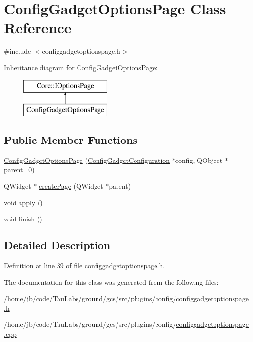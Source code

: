 \hypertarget{class_config_gadget_options_page}{\section{\-Config\-Gadget\-Options\-Page \-Class \-Reference}
\label{class_config_gadget_options_page}
}


{\ttfamily \#include $<$configgadgetoptionspage.\-h$>$}

\-Inheritance diagram for \-Config\-Gadget\-Options\-Page\-:\begin{figure}[H]
\begin{center}
\leavevmode
\includegraphics[height=2.000000cm]{class_config_gadget_options_page}
\end{center}
\end{figure}
\subsection*{\-Public \-Member \-Functions}
\begin{DoxyCompactItemize}
\item 
\hyperlink{group___config_plugin_ga2d5af20878472037582f441a56bca28c}{\-Config\-Gadget\-Options\-Page} (\hyperlink{class_config_gadget_configuration}{\-Config\-Gadget\-Configuration} $\ast$config, \-Q\-Object $\ast$parent=0)
\item 
\-Q\-Widget $\ast$ \hyperlink{group___config_plugin_ga28c537e8f2468debe3c869bda53fd6c9}{create\-Page} (\-Q\-Widget $\ast$parent)
\item 
\hyperlink{group___u_a_v_objects_plugin_ga444cf2ff3f0ecbe028adce838d373f5c}{void} \hyperlink{group___config_plugin_gab4d162de9174c38e3567e117a5b5c70f}{apply} ()
\item 
\hyperlink{group___u_a_v_objects_plugin_ga444cf2ff3f0ecbe028adce838d373f5c}{void} \hyperlink{group___config_plugin_gae12bea8fac88d0fd0b9d3c95b0e62472}{finish} ()
\end{DoxyCompactItemize}


\subsection{\-Detailed \-Description}


\-Definition at line 39 of file configgadgetoptionspage.\-h.



\-The documentation for this class was generated from the following files\-:\begin{DoxyCompactItemize}
\item 
/home/jb/code/\-Tau\-Labs/ground/gcs/src/plugins/config/\hyperlink{configgadgetoptionspage_8h}{configgadgetoptionspage.\-h}\item 
/home/jb/code/\-Tau\-Labs/ground/gcs/src/plugins/config/\hyperlink{configgadgetoptionspage_8cpp}{configgadgetoptionspage.\-cpp}\end{DoxyCompactItemize}

